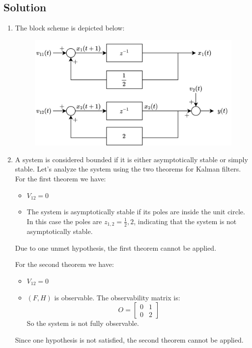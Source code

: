 \subsection*{Solution}
\begin{enumerate}
    \item The block scheme is depicted below:
        \begin{figure}[H]
            \centering
            \includegraphics[width=0.75\linewidth]{images/ex1.png}
        \end{figure}
    \item A system is considered bounded if it is either asymptotically stable or simply stable. 
        Let's analyze the system using the two theorems for Kalman filters.
        For the first theorem we have: 
        \begin{itemize}
            \item $V_{12}=0$
            \item The system is asymptotically stable if its poles are inside the unit circle.
                In this case the poles are $z_{1,2}=\frac{1}{2},2$, indicating that the system is not asymptotically stable.
        \end{itemize}
        Due to one unmet hypothesis, the first theorem cannot be applied.

        For the second theorem we have: 
        \begin{itemize}
            \item $V_{12}=0$
            \item $(F,H)$ is observable. 
                The observability matrix is: 
                \[O=\begin{bmatrix} 0 & 1 \\ 0 & 2 \end{bmatrix}\]
                So the system is not fully observable. 
        \end{itemize}
        Since one hypothesis is not satisfied, the second theorem cannot be applied.


\end{enumerate}
